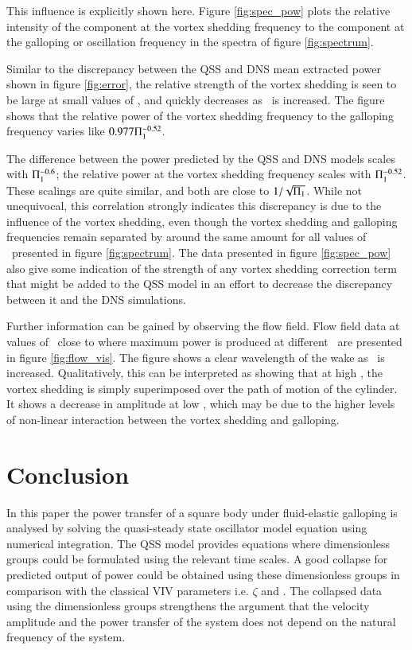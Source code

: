 This influence is explicitly shown here. Figure \ref{fig:spec_pow} plots the relative intensity of the component at the vortex shedding frequency to the component at the galloping or oscillation frequency in the spectra of figure \ref{fig:spectrum}.





Similar to the discrepancy between the QSS and DNS mean extracted power shown in figure \ref{fig:error}, the relative strength of the vortex shedding is seen to be large at small values of \massstiff, and quickly decreases as \massstiff\ is increased. The figure shows that the relative power of the vortex shedding frequency to the galloping frequency varies like $0.977\Pi_1^{-0.52}$.

The difference between the power predicted by the QSS and DNS models scales with $\Pi_1^{-0.6}$; the relative power at the vortex shedding frequency scales with $\Pi_1^{-0.52}$. These scalings are quite similar, and both are close to $1/\sqrt{\Pi_1}$. While not unequivocal, this correlation strongly indicates this discrepancy is due to the influence of the vortex shedding, even though the vortex shedding and galloping frequencies remain separated by around the same amount for all values of \massstiff\ presented in figure \ref{fig:spectrum}. The data presented in figure \ref{fig:spec_pow} also give some indication of the strength of any vortex shedding correction term that might be added to the QSS model in an effort to decrease the discrepancy between it and the DNS simulations.



Further information can be gained by observing the flow field. Flow field data at values of \massdamp\ close to where maximum power is produced at different \massstiff\ are presented in figure \ref{fig:flow_vis}. The figure shows a clear wavelength of the wake as \massstiff \ is increased. Qualitatively, this can be interpreted as showing that at high \massstiff, the vortex shedding is simply superimposed over the path of motion of the cylinder. It shows a decrease in amplitude at low \massstiff, which may be due to the higher levels of non-linear interaction between the vortex shedding and galloping.
 
\section{Conclusion}
\label{sec:conc}
In this paper the power transfer of a square body under fluid-elastic galloping is analysed by solving the quasi-steady state oscillator model equation using numerical  integration. The QSS model provides equations where dimensionless groups could be formulated using the relevant time scales. A good collapse for predicted output of power could be obtained using these dimensionless groups in comparison with the classical VIV parameters i.e. $\zeta$ and \ustar. The collapsed data using the dimensionless groups strengthens the argument that the velocity amplitude and the power transfer of the system does not depend on the natural frequency of the system. 
  
